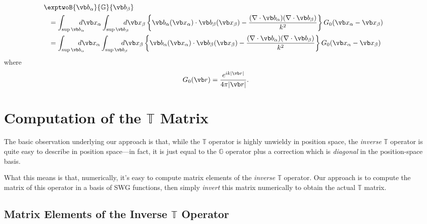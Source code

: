 \documentclass[letterpaper]{article}
\begin{document}
\begin{align}
&\hspace{-0.1in}
  \exptwoB{\vb b_\alpha}{\mathbb{G}}{\vb b_\beta}
\\
&= \int_{\sup\vb b_\alpha} \!\!\!\!\!\!\! \, d\vb x_\alpha
   \int_{\sup\vb b_\beta} \!\!\!\!\!\!\! \, d\vb x_\beta
   \left\{ \vb b_{\alpha}(\vb x_\alpha) \cdot \vb b_\beta(\vb x_\beta)
           -\frac{ (\nabla \cdot \vb b_\alpha) (\nabla \cdot \vb b_\beta)}
                 { k^2 }
   \right\}
   G_0(\vb x_\alpha -\vb x_\beta)
\\
&= 
   \int_{\sup\vb b_\alpha} \!\!\!\!\!\!\! d\vb x_\alpha
   \int_{\sup\vb b_\beta}  \!\!\!\!\!\!\! d\vb x_\beta
   \left\{ \vb b_{\alpha}(\vb x_\alpha) \cdot \vb b_\beta(\vb x_\beta)
           -\frac{ (\nabla \cdot \vb b_\alpha) (\nabla \cdot \vb b_\beta)}
                 { k^2 }
   \right\}
   G_0(\vb x_\alpha -\vb x_\beta)
\label{G0Volume}
\end{align}
where 
$$ G_0(\vb r)=\frac{e^{ik|\vb r|}}{4\pi |\vb r|}.$$

\section{Computation of the $\mathbb{T}$ Matrix}

The basic observation underlying our approach is that,
while the $\mathbb{T}$ operator is highly unwieldy in position space,
the \textit{inverse} $\mathbb{T}$ operator is quite easy to 
describe in position space---in fact, it is just equal to the 
$\mathbb{G}$ operator plus a correction which is \textit{diagonal}
in the position-space basis. 

What this means is that, numerically, it's easy to compute
matrix elements of the \textit{inverse} $\mathbb{T}$ operator.
Our approach is to compute the matrix of this operator in 
a basis of SWG functions,
then simply \textit{invert} this matrix numerically to obtain
the actual $\mathbb{T}$ matrix.

\subsection{Matrix Elements of the Inverse $\mathbb{T}$ Operator}
\end{document}
